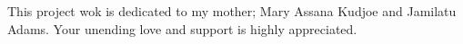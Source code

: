 
\begin{dedication} %
{}
\centering
This project wok is dedicated to my mother; Mary Assana Kudjoe and Jamilatu Adams. Your unending love and support is highly appreciated.
\end{dedication}

